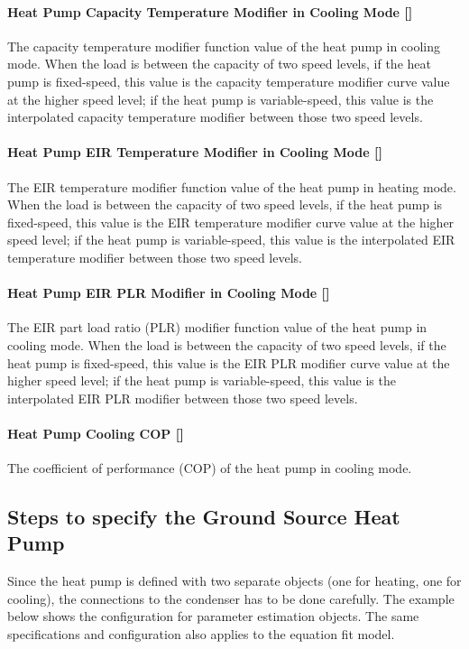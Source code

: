 \paragraph{Heat Pump Capacity Temperature Modifier in Cooling Mode {[}{]}}
The capacity temperature modifier function value of the heat pump in cooling
mode. When the load is between the capacity of two speed levels, if the heat
pump is fixed-speed, this value is the capacity temperature modifier curve value
at the higher speed level; if the heat pump is variable-speed, this value is the
interpolated capacity temperature modifier between those two speed levels.
\paragraph{Heat Pump EIR Temperature Modifier in Cooling Mode {[}{]}}
The EIR temperature modifier function value of the heat pump in heating
mode. When the load is between the capacity of two speed levels, if the heat
pump is fixed-speed, this value is the EIR temperature modifier curve value
at the higher speed level; if the heat pump is variable-speed, this value is the
interpolated EIR temperature modifier between those two speed levels.
\paragraph{Heat Pump EIR PLR Modifier in Cooling Mode {[}{]}}
The EIR part load ratio (PLR) modifier function value of the heat pump in cooling
mode. When the load is between the capacity of two speed levels, if the heat
pump is fixed-speed, this value is the EIR PLR modifier curve value
at the higher speed level; if the heat pump is variable-speed, this value is the
interpolated EIR PLR modifier between those two speed levels.
\paragraph{Heat Pump Cooling COP {[}{]}} The coefficient of performance (COP) of
the heat pump in cooling mode.

\subsection{Steps to specify the Ground Source Heat Pump}\label{steps-to-specify-the-ground-source-heat-pump}

Since the heat pump is defined with two separate objects (one for heating, one for cooling), the connections to the condenser has to be done carefully. The example below shows the configuration for parameter estimation objects. The same specifications and configuration also applies to the equation fit model.


